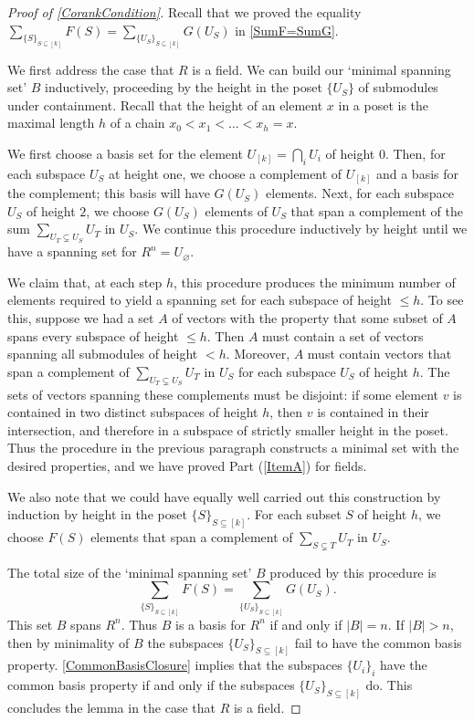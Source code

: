 \documentclass[a4paper]{amsart}
\numberwithin{theoremcounter}{section}
\theoremstyle{definition}
\theoremstyle{remark}
\begin{document}
\begin{proof}[Proof of \autoref{CorankCondition}] 

Recall that we proved  the equality $  \sum_{\{S\}_{S \subseteq [k]}} F(S) =  \sum_{\{U_S\}_{S \subseteq [k]}} G(U_S) $
in \autoref{SumF=SumG}. 

We first address the case that $R$ is a field. We can build our `minimal spanning set' $B$ inductively, proceeding by the height in the poset $\{U_S\}$ of submodules under containment.  Recall that the height of an element $x$ in a poset is the maximal length $h$ of a chain $x_0 < x_1 < \dots <x_h=x$.  

We first choose a basis set for the element $U_{[k]} = \bigcap_i U_i$ of height 0. Then, for each subspace $U_S$ at height one, we choose a complement of $U_{[k]}$ and a basis for the complement; this basis will have $G(U_S)$ elements.  
Next, for each subspace $U_S$ of height $2$, we choose $G(U_S)$ elements of $U_S$ that span a complement of the sum $\sum_{U_T \subsetneq U_S} U_T$ in $U_S$. We continue this procedure inductively by height  until we have a spanning set for $R^n = U_\varnothing$. 

We claim that, at each step $h$, this procedure produces the minimum number of elements required to yield a spanning set for each subspace of height $\leq h$. To see this, suppose we had a set $A$ of vectors with the property that some subset of $A$ spans every subspace of height $\leq h$. Then $A$ must contain a set of vectors spanning all submodules of height $<h$. Moreover, $A$ must contain vectors that span a complement of  $\sum_{U_T \subsetneq U_S} U_T$ in $U_S$ for each subspace $U_S$ of height $h$. The sets of vectors spanning these complements must be disjoint:  if some element $v$ is contained in two distinct subspaces of height $h$, then $v$ is contained in their intersection, and therefore in a subspace of strictly smaller height in the poset. Thus the procedure in the previous paragraph constructs a minimal set with the desired properties, and we have proved Part (\ref{ItemA}) for fields. 

We also note that we could have equally well carried out this construction by induction by height in the poset $\{S\}_{S \subseteq [k]}$. For each subset $S$ of height $h$, we choose $F(S)$ elements that span a complement of $\sum_{S \subsetneq T} U_T$ in $U_S$. 

The total size of the `minimal spanning set' $B$ produced by this procedure is $$  \sum_{\{S\}_{S \subseteq [k]}} F(S) =  \sum_{\{U_S\}_{S \subseteq [k]}} G(U_S). $$  This set $B$ spans $R^n$. Thus $B$ is a basis for $R^n$ if and only if $|B|=n$. If $|B|>n$, then  by minimality of $B$ the subspaces $\{U_S\}_{S \subseteq [k]}$ fail to have the common basis property. \autoref{CommonBasisClosure} implies that the subspaces $\{U_i\}_i$ have the common basis property if and only if the subspaces $\{U_S\}_{S \subseteq [k]}$ do. This concludes the lemma in the case that $R$ is a field. 


\end{proof}
\end{document}
